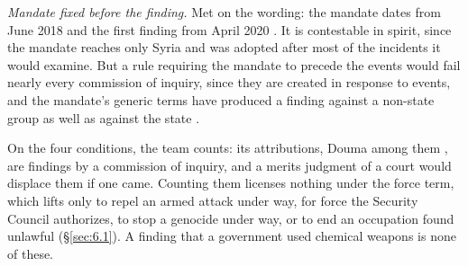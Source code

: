 \emph{Mandate fixed before the finding.} Met on the wording: the mandate dates from June 2018 and the first finding from April 2020 \autocite{opcw2020iitltamenah}. It is contestable in spirit, since the mandate reaches only Syria and was adopted after most of the incidents it would examine. But a rule requiring the mandate to precede the events would fail nearly every commission of inquiry, since they are created in response to events, and the mandate's generic terms have produced a finding against a non-state group as well as against the state \autocite{opcw2024iitmarea}.

On the four conditions, the team counts: its attributions, Douma among them \autocite{opcw2023iitdouma}, are findings by a commission of inquiry, and a merits judgment of a court would displace them if one came. Counting them licenses nothing under the force term, which lifts only to repel an armed attack under way, for force the Security Council authorizes, to stop a genocide under way, or to end an occupation found unlawful (\S\ref{sec:6.1}). A finding that a government used chemical weapons is none of these.
